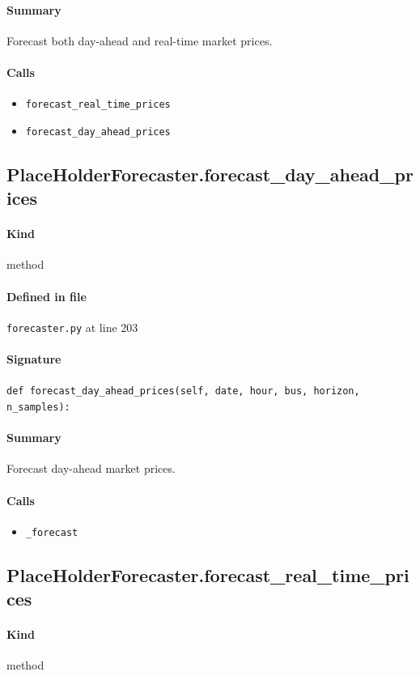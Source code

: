 \documentclass[11pt]{report}
\begin{document}
\paragraph{Summary} Forecast both day-ahead and real-time market prices.
\paragraph{Calls}
\begin{itemize}[leftmargin=*]
  \item \texttt{forecast\_real\_time\_prices}
  \item \texttt{forecast\_day\_ahead\_prices}
\end{itemize}
\subsection{PlaceHolderForecaster.forecast\_day\_ahead\_prices}
\label{def:forecaster.py:PlaceHolderForecaster.forecast_day_ahead_prices:L203}
\paragraph{Kind} method
\paragraph{Defined in file} \texttt{forecaster.py} at line 203
\paragraph{Signature} \texttt{def forecast\_day\_ahead\_prices(self, date, hour, bus, horizon, n\_samples):}
\paragraph{Summary} Forecast day-ahead market prices.
\paragraph{Calls}
\begin{itemize}[leftmargin=*]
  \item \texttt{\_forecast}
\end{itemize}
\subsection{PlaceHolderForecaster.forecast\_real\_time\_prices}
\label{def:forecaster.py:PlaceHolderForecaster.forecast_real_time_prices:L231}
\paragraph{Kind} method
\end{document}
